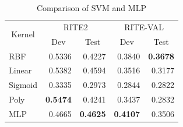 \documentclass[12pt]{article}
\makeatletter
\renewcommand\paragraph{\@startsection{paragraph}{5}{\z@}%
  {3.25ex \@plus1ex \@minus.2ex}%
  {-1em}%
  {\normalfont\normalsize\bfseries}}
\makeatother
\begin{document}
\begin{CJK*}{UTF8}{bkai}
\begin{spacing}{1.77}
\begin{table}[H]
  \centering
  \setlength{\extrarowheight}{-3pt}
  \caption{Comparison of SVM and MLP}
  \label{svm_kernel}
  \begin{tabular}{|l|r|r|r|r|}
  \hline
  \multicolumn{1}{|c|}{\multirow{2}{*}{Kernel}} & \multicolumn{2}{c|}{RITE2} & \multicolumn{2}{c|}{RITE-VAL} \\ \cline{2-5}
  \multicolumn{1}{|c|}{} & \multicolumn{1}{c|}{Dev} & \multicolumn{1}{c|}{Test} & \multicolumn{1}{c|}{Dev} & \multicolumn{1}{c|}{Test} \\ \hline
  RBF & 0.5336 & 0.4227 & 0.3840 & \textbf{0.3678} \\ \hline
  Linear & 0.5382 & 0.4594 & 0.3516 & 0.3177 \\ \hline
  Sigmoid & 0.3335 & 0.2973 & 0.2844 & 0.2822 \\ \hline
  Poly & \textbf{0.5474} & 0.4241 & 0.3437 & 0.2832 \\ \hline
  MLP & 0.4665 & \textbf{0.4625} & \textbf{0.4107} & 0.3506 \\ \hline
  \end{tabular}
\end{table}



\end{spacing}
\end{CJK*}
\end{document}
